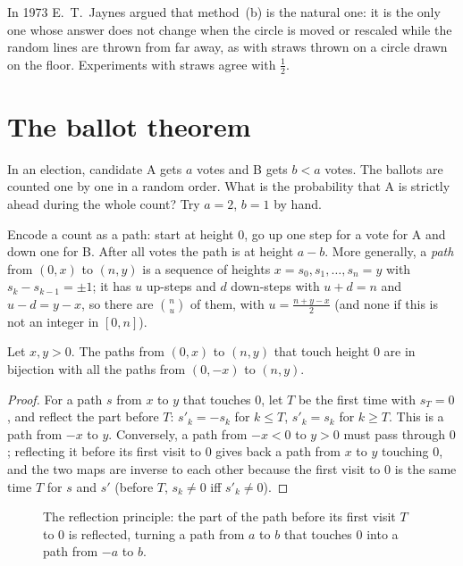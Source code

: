 \begin{remark}
In 1973 E.~T.~Jaynes argued that method~(b) is the natural one: it is the only one whose answer does not change
when the circle is moved or rescaled while the random lines are thrown from far away, as with straws thrown on a
circle drawn on the floor. Experiments with straws agree with $\frac12$.
\end{remark}

\section{The ballot theorem}

\begin{think}
In an election, candidate A gets $a$ votes and B gets $b<a$ votes. The ballots are counted one by one in a random
order. What is the probability that A is strictly ahead during the whole count? Try $a=2$, $b=1$ by hand.
\end{think}

Encode a count as a path: start at height $0$, go up one step for a vote for A and down one for B. After all
votes the path is at height $a-b$. More generally, a \emph{path} from $(0,x)$ to $(n,y)$ is a sequence of heights
$x=s_0,s_1,\dots,s_n=y$ with $s_{k}-s_{k-1}=\pm1$; it has $u$ up-steps and $d$ down-steps with $u+d=n$ and
$u-d=y-x$, so there are $\binom nu$ of them, with $u=\frac{n+y-x}2$ (and none if this is not an integer in
$[0,n]$).

\begin{lemma}\label{lem:reflection}
Let $x,y>0$. The paths from $(0,x)$ to $(n,y)$ that touch height $0$ are in bijection with all the paths from
$(0,-x)$ to $(n,y)$.
\end{lemma}
\begin{proof}
For a path $s$ from $x$ to $y$ that touches $0$, let $T$ be the first time with $s_T=0$, and reflect the part
before $T$: $s'_k=-s_k$ for $k\le T$, $s'_k=s_k$ for $k\ge T$. This is a path from $-x$ to $y$. Conversely, a
path from $-x<0$ to $y>0$ must pass through $0$; reflecting it before its first visit to $0$ gives back a path
from $x$ to $y$ touching $0$, and the two maps are inverse to each other because the first visit to $0$ is the
same time $T$ for $s$ and $s'$ (before $T$, $s_k\ne0$ iff $s'_k\ne0$).
\end{proof}

\begin{figure}[ht]
\centering
{}
\caption{The reflection principle: the part of the path before its first visit $T$ to $0$ is reflected, turning
a path from $a$ to $b$ that touches $0$ into a path from $-a$ to $b$.}
\label{fig:reflection}
\end{figure}

